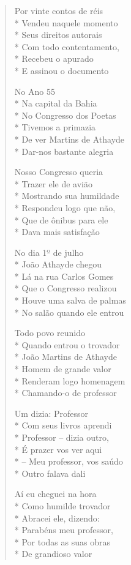 \begin{verse}
Por vinte contos de réis\\*
Vendeu naquele momento\\*
Seus direitos autorais\\*
Com todo contentamento,\\*
Recebeu o apurado\\*
E assinou o documento

No Ano 55\\*
Na capital da Bahia\\*
No Congresso dos Poetas\\*
Tivemos a primazia\\*
De ver Martins de Athayde\\*
Dar-nos bastante alegria

Nosso Congresso queria\\*
Trazer ele de avião\\*
Mostrando sua humildade\\*
Respondeu logo que não,\\*
Que de ônibus para ele\\*
Dava mais satisfação

No dia 1º de julho\\*
João Athayde chegou\\*
Lá na rua Carlos Gomes\\*
Que o Congresso realizou\\*
Houve uma salva de palmas\\*
No salão quando ele entrou

Todo povo reunido\\*
Quando entrou o trovador\\*
João Martins de Athayde\\*
Homem de grande valor\\*
Renderam logo homenagem\\*
Chamando-o de professor

Um dizia: Professor\\*
Com seus livros aprendi\\*
Professor -- dizia outro,\\*
É prazer vos ver aqui\\*
{}-- Meu professor, vos saúdo\\*
Outro falava dali

Aí eu cheguei na hora\\*
Como humilde trovador\\*
Abracei ele, dizendo:\\*
Parabéns meu professor,\\*
Por todas as suas obras\\*
De grandioso valor


\end{verse}
